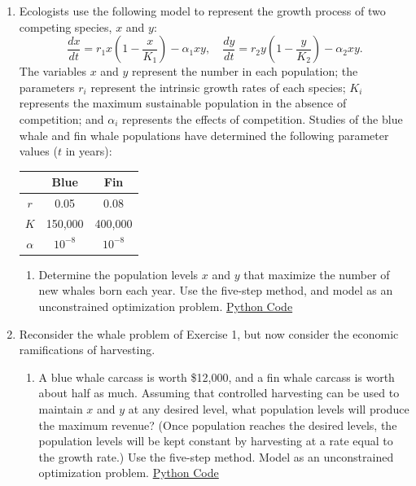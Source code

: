 \documentclass[12pt, oneside]{book}
\newenvironment{solution}{\textit{Solution.}}
\newcommand{\sol}[1]{
    \begin{customframedproof}[linecolor=orangehdx!75,]
        \begin{solution}
        #1
        \end{solution}
    \end{customframedproof}
}
\begin{document}
\begin{enumerate}
    \item Ecologists use the following model to represent the growth process of two competing species, \(x\) and \(y\):
    \[
        \frac{dx}{dt} = r_{1}x\left(1 - \frac{x}{K_{1}}\right) - \alpha_{1}xy, \quad \frac{dy}{dt} = r_{2}y\left(1 - \frac{y}{K_{2}}\right) - \alpha_{2}xy.
    \]
    The variables \(x\) and \(y\) represent the number in each population; the parameters \(r_{i}\) represent the intrinsic growth rates of each species; \(K_{i}\) represents the maximum sustainable population in the absence of competition; and \(\alpha_{i}\) represents the effects of competition. Studies of the blue whale and fin whale populations have determined the following parameter values (\(t\) in years):

    \begin{center}
        \begin{tabular}[htbp]{ccc}
            \toprule
            & Blue & Fin \\ \midrule
            \(r\) & 0.05 & 0.08 \\
            \(K\) & 150,000 & 400,000 \\ 
            \(\alpha\) & \(10^{-8}\) & \(10^{-8}\) \\ \bottomrule
        \end{tabular}
    \end{center}
    \begin{enumerate}
        \item Determine the population levels \(x\) and \(y\) that maximize the number of new whales born each year. Use the five-step method, and model as an unconstrained optimization problem. \hyperref[ex:1]{Python Code}
    \end{enumerate}
    \setcounter{enumi}{2}

    \item Reconsider the whale problem of Exercise 1, but now consider the economic ramifications of harvesting. 
    \begin{enumerate}
        \item A blue whale carcass is worth \$12,000, and a fin whale carcass is worth about half as much. Assuming that controlled harvesting can be used to maintain \(x\) and \(y\) at any desired level, what population levels will produce the maximum revenue? (Once population reaches the desired levels, the population levels will be kept constant by harvesting at a rate equal to the growth rate.) Use the five-step method. Model as an unconstrained optimization problem. \hyperref[ex:3]{Python Code}
        

\end{enumerate}
\end{enumerate}
\end{document}
